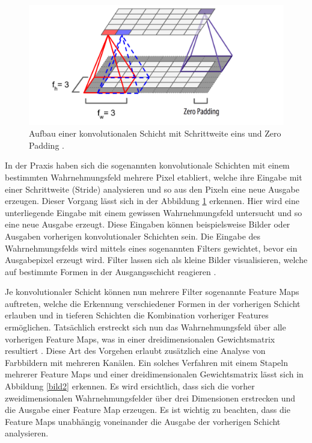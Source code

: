 \documentclass[twoside,a4paper]{IEEEtran}
\begin{document}
\begin{figure}[!htb]
	\includegraphics[width=\columnwidth]{cnn}
	\caption{Aufbau einer konvolutionalen Schicht mit Schrittweite eins und Zero Padding \cite[S.362]{MACHINE_LEARNING}.}
	\label{bild1}
\end{figure}

In der Praxis haben sich die sogenannten konvolutionale Schichten mit einem bestimmten Wahrnehmungsfeld mehrere Pixel etabliert, welche  ihre Eingabe mit einer Schrittweite (Stride) analysieren und so aus den Pixeln eine neue Ausgabe erzeugen. Dieser Vorgang lässt sich in der Abbildung \ref{bild1} erkennen. Hier wird eine unterliegende Eingabe mit einem gewissen Wahrnehmungsfeld untersucht und so eine neue Ausgabe erzeugt. Diese Eingaben können beispielsweise Bilder oder Ausgaben vorherigen konvolutionaler Schichten sein. Die Eingabe des Wahrnehmungsfelds wird mittels eines sogenannten Filters gewichtet, bevor ein Ausgabepixel erzeugt wird. Filter lassen sich als kleine Bilder visualisieren, welche auf bestimmte Formen in der Ausgangsschicht reagieren \cite[S.361-363]{MACHINE_LEARNING}. 

Je konvolutionaler Schicht können nun mehrere Filter sogenannte Feature Maps auftreten, welche die Erkennung verschiedener Formen in der vorherigen Schicht erlauben und in tieferen Schichten die Kombination vorheriger Features ermöglichen. Tatsächlich erstreckt sich nun das Wahrnehmungsfeld über alle vorherigen Feature Maps, was in einer dreidimensionalen Gewichtsmatrix resultiert \cite[S.364-365]{MACHINE_LEARNING}. Diese Art des Vorgehen erlaubt zusätzlich eine Analyse von Farbbildern mit mehreren Kanälen. Ein solches Verfahren mit einem Stapeln mehrerer Feature Maps und einer dreidimensionalen Gewichtsmatrix lässt sich in Abbildung \ref{bild2} erkennen. Es wird ersichtlich, dass sich die vorher zweidimensionalen Wahrnehmungsfelder über drei Dimensionen erstrecken und die Ausgabe einer Feature Map erzeugen. Es ist wichtig zu beachten, dass die Feature Maps unabhängig voneinander die Ausgabe der vorherigen Schicht analysieren. 
\end{document}
